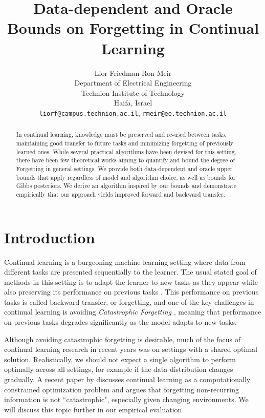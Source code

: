 \documentclass{article}
\title{Data-dependent and Oracle Bounds on Forgetting in Continual Learning}
\author{%
  Lior Friedman \quad \quad \quad \quad Ron Meir \\
  Department of Electrical Engineering\\
  Technion Institute of Technology\\
  Haifa, Israel  \\
  \texttt{liorf@campus.technion.ac.il}, \texttt{rmeir@ee.technion.ac.il} \\
}
\theoremstyle{plain}
\theoremstyle{definition}
\theoremstyle{remark}
\newcommand{\RM}[1]{{\textcolor{magenta}{#1}}}
\newcommand{\LF}[1]{{\textcolor{blue}{#1}}}
\begin{document}
\maketitle

\begin{abstract}
    In continual learning, knowledge must be preserved and re-used between tasks, maintaining good transfer to future tasks and minimizing forgetting of previously learned ones. While several practical algorithms have been devised for this setting, there have been few theoretical works aiming to quantify and bound the degree of Forgetting in general settings. We provide both data-dependent and oracle upper bounds that apply regardless of model and algorithm choice, as well as bounds for Gibbs posteriors. We derive an algorithm inspired by our bounds and demonstrate empirically that our approach yields improved forward and backward transfer.
\end{abstract}

\section{Introduction}

Continual learning is a burgeoning machine learning setting where data from different tasks
are presented sequentially to the learner. The usual stated goal of methods in this setting is to adapt the learner to new tasks as they appear while also preserving its performance on previous tasks \cite{de2021continual, hadsell2020embracing,parisi2019continual}.
This performance on previous tasks is called backward transfer, or forgetting, and one of the key challenges in continual learning is avoiding \emph{Catastrophic Forgetting} \cite{goodfellow2014empirical,ramasesh2020anatomy,kirkpatrick2017overcoming}, meaning that performance on previous tasks degrades significantly as the model adapts to new tasks. 

Although avoiding catastrophic forgetting is desirable, much of the focus of continual learning research in recent years was on settings with a shared optimal solution. Realistically, 
we should not expect a single algorithm to perform optimally across all settings, for example if the data distribution changes gradually. A recent paper by \citet{kumar2023continual} discusses continual learning
as a computationally constrained optimization problem and argues that forgetting non-recurring
information is not “catastrophic", especially given changing environments. We will discuss this topic further in our empirical evaluation.
\end{document}
